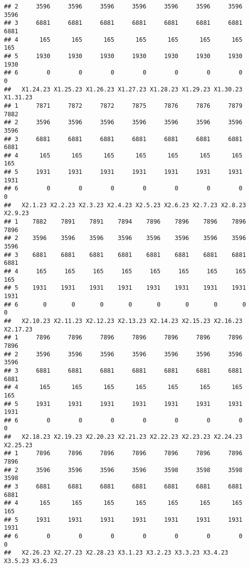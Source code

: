 \documentclass[
]{article}
\begin{document}
\begin{verbatim}
## 2     3596     3596     3596     3596     3596     3596     3596     3596
## 3     6881     6881     6881     6881     6881     6881     6881     6881
## 4      165      165      165      165      165      165      165      165
## 5     1930     1930     1930     1930     1930     1930     1930     1930
## 6        0        0        0        0        0        0        0        0
##   X1.24.23 X1.25.23 X1.26.23 X1.27.23 X1.28.23 X1.29.23 X1.30.23 X1.31.23
## 1     7871     7872     7872     7875     7876     7876     7879     7882
## 2     3596     3596     3596     3596     3596     3596     3596     3596
## 3     6881     6881     6881     6881     6881     6881     6881     6881
## 4      165      165      165      165      165      165      165      165
## 5     1931     1931     1931     1931     1931     1931     1931     1931
## 6        0        0        0        0        0        0        0        0
##   X2.1.23 X2.2.23 X2.3.23 X2.4.23 X2.5.23 X2.6.23 X2.7.23 X2.8.23 X2.9.23
## 1    7882    7891    7891    7894    7896    7896    7896    7896    7896
## 2    3596    3596    3596    3596    3596    3596    3596    3596    3596
## 3    6881    6881    6881    6881    6881    6881    6881    6881    6881
## 4     165     165     165     165     165     165     165     165     165
## 5    1931    1931    1931    1931    1931    1931    1931    1931    1931
## 6       0       0       0       0       0       0       0       0       0
##   X2.10.23 X2.11.23 X2.12.23 X2.13.23 X2.14.23 X2.15.23 X2.16.23 X2.17.23
## 1     7896     7896     7896     7896     7896     7896     7896     7896
## 2     3596     3596     3596     3596     3596     3596     3596     3596
## 3     6881     6881     6881     6881     6881     6881     6881     6881
## 4      165      165      165      165      165      165      165      165
## 5     1931     1931     1931     1931     1931     1931     1931     1931
## 6        0        0        0        0        0        0        0        0
##   X2.18.23 X2.19.23 X2.20.23 X2.21.23 X2.22.23 X2.23.23 X2.24.23 X2.25.23
## 1     7896     7896     7896     7896     7896     7896     7896     7896
## 2     3596     3596     3596     3596     3598     3598     3598     3598
## 3     6881     6881     6881     6881     6881     6881     6881     6881
## 4      165      165      165      165      165      165      165      165
## 5     1931     1931     1931     1931     1931     1931     1931     1931
## 6        0        0        0        0        0        0        0        0
##   X2.26.23 X2.27.23 X2.28.23 X3.1.23 X3.2.23 X3.3.23 X3.4.23 X3.5.23 X3.6.23

\end{verbatim}
\end{document}
